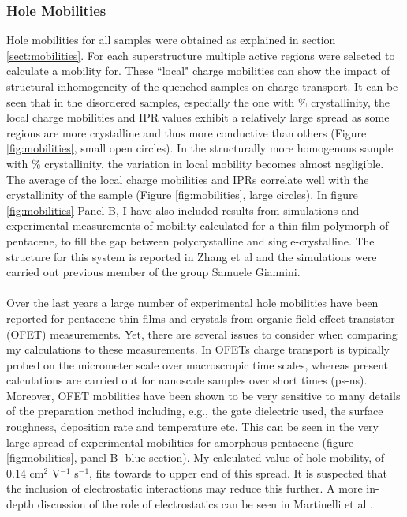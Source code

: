 \subsubsection{Hole Mobilities}
Hole mobilities for all samples were obtained as explained in section \ref{sect:mobilities}. For each superstructure multiple active regions were selected to calculate a mobility for. These ``local" charge mobilities can show the impact of structural inhomogeneity of the quenched samples on charge transport. It can be seen that in the disordered samples, especially the one with \mremove{$\sim$}\% crystallinity, the local charge mobilities and IPR values exhibit a relatively large spread as some regions are more crystalline and thus more conductive than others (Figure \ref{fig:mobilities}, small open circles). In the structurally more homogenous sample with \% crystallinity, the variation in local mobility becomes almost negligible. The average of the local charge mobilities and IPRs correlate well with the crystallinity of the sample (Figure \ref{fig:mobilities}, large circles). In figure \ref{fig:mobilities} Panel B, I have also included results from simulations and experimental measurements of mobility calculated for a  thin film polymorph of pentacene, to fill the gap between polycrystalline and single-crystalline. The structure for this system is reported in Zhang et al \cite{Zhang2016TF} and the simulations were carried out  previous member of the group Samuele Giannini.
\\\\
Over the last  years a large number of experimental hole mobilities have been reported for pentacene thin films and crystals from organic field effect transistor (OFET) measurements. Yet, there are several issues to consider when comparing my calculations to these measurements. In OFETs charge transport is typically probed on the micrometer scale over macroscropic time scales, whereas present calculations are carried out for nanoscale samples over short times (ps-ns). Moreover, OFET mobilities have been shown to be very sensitive to many details of the preparation method including, e.g., the gate dielectric used, the surface roughness, deposition rate and temperature etc. This can be seen in the very large spread of experimental mobilities  for amorphous pentacene (figure \ref{fig:mobilities}, panel B -blue section). My calculated value of hole mobility, of 0.14 cm$^2$ V$^{-1}$ s$^{-1}$, fits towards to upper end of this spread. It is suspected that the inclusion of electrostatic interactions may reduce this further. A more in-depth discussion of the role of electrostatics can be seen in Martinelli et al \cite{ESEffectOnMob}.
